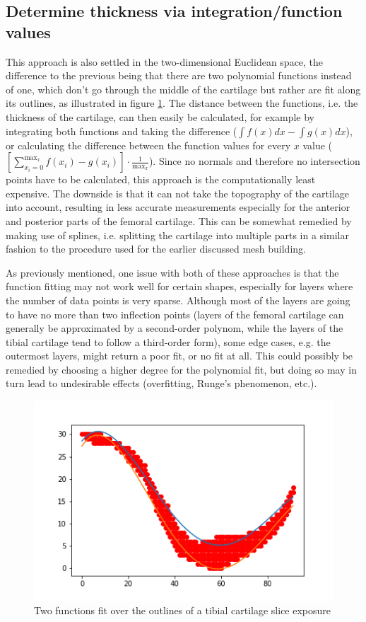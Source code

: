 \subsection{Determine thickness via integration/function values}
\label{sec:Integration}
This approach is also settled in the two-dimensional Euclidean space, the difference to the previous being that there are two polynomial functions instead of one, which don't go through the middle of the cartilage but rather are fit along its outlines, as illustrated in figure \ref{fig:integration}. The distance between the functions, i.e. the thickness of the cartilage, can then easily be calculated, for example by integrating both functions and taking the difference ($\int f(x) dx - \int g(x) dx$), or calculating the difference between the function values for every $x$ value ($[\sum_{x_i = 0}^{\max_{x}} f(x_i) - g(x_i)] \cdot \frac{1}{\max_{x}}$). Since no normals and therefore no intersection points have to be calculated, this approach is the computationally least expensive. The downside is that it can not take the topography of the cartilage into account, resulting in less accurate measurements especially for the anterior and posterior parts of the femoral cartilage. This can be somewhat remedied by making use of splines, i.e. splitting the cartilage into multiple parts in a similar fashion to the procedure used for the earlier discussed mesh building.
\par
As previously mentioned, one issue with both of these approaches is that the function fitting may not work well for certain shapes, especially for layers where the number of data points is very sparse. Although most of the layers are going to have no more than two inflection points (layers of the femoral cartilage can generally be approximated by a second-order polynom, while the layers of the tibial cartilage tend to follow a third-order form), some edge cases, e.g. the outermost layers, might return a poor fit, or no fit at all. This could possibly be remedied by choosing a higher degree for the polynomial fit, but doing so may in turn lead to undesirable effects (overfitting, Runge's phenomenon, etc.).
\begin{figure}[]
	\centering
	\includegraphics[width=\linewidth]{./figures/integration}
	\caption{Two functions fit over the outlines of a tibial cartilage slice exposure}
	\label{fig:integration}
\end{figure}